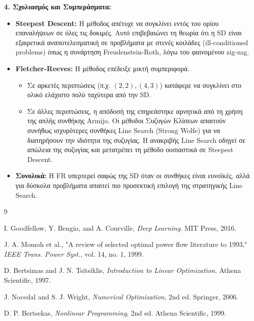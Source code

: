 \documentclass[a4paper,12pt]{article}
\begin{document}
\textbf{4. Σχολιασμός και Συμπεράσματα:}
\begin{itemize}
    \item \textbf{Steepest Descent:} Η μέθοδος απέτυχε να συγκλίνει εντός του ορίου επαναλήψεων σε όλες τις δοκιμές. Αυτό επιβεβαιώνει τη θεωρία ότι η SD είναι εξαιρετικά αναποτελεσματική σε προβλήματα με στενές κοιλάδες (ill-conditioned problems) όπως η συνάρτηση Freudenstein-Roth, λόγω του φαινομένου zig-zag.
    \item \textbf{Fletcher-Reeves:} Η μέθοδος επέδειξε μικτή συμπεριφορά.
    \begin{itemize}
        \item Σε αρκετές περιπτώσεις (π.χ. $(2,2), (4,3)$) κατάφερε να συγκλίνει στο ολικό ελάχιστο πολύ ταχύτερα από την SD.
        \item Σε άλλες περιπτώσεις, η απόδοσή της επηρεάστηκε αρνητικά από τη χρήση της απλής συνθήκης Armijo. Οι μέθοδοι Συζυγών Κλίσεων απαιτούν συνήθως ισχυρότερες συνθήκες Line Search (Strong Wolfe) για να διατηρήσουν την ιδιότητα της συζυγίας. Η ανακριβής Line Search οδηγεί σε απώλεια της συζυγίας και μετατρέπει τη μέθοδο ουσιαστικά σε Steepest Descent.
    \end{itemize}
    \item \textbf{Συνολικά:} Η FR υπερτερεί σαφώς της SD όταν οι συνθήκες είναι ευνοϊκές, αλλά για δύσκολα προβλήματα απαιτεί πιο προσεκτική επιλογή της στρατηγικής Line Search.
\end{itemize}

\begin{thebibliography}{9}

I. Goodfellow, Y. Bengio, and A. Courville, \textit{Deep Learning}. MIT Press, 2016.

J. A. Momoh et al., "A review of selected optimal power flow literature to 1993," \textit{IEEE Trans. Power Syst.}, vol. 14, no. 1, 1999.

D. Bertsimas and J. N. Tsitsiklis, \textit{Introduction to Linear Optimization}. Athena Scientific, 1997.

J. Nocedal and S. J. Wright, \textit{Numerical Optimization}, 2nd ed. Springer, 2006.

D. P. Bertsekas, \textit{Nonlinear Programming}, 2nd ed. Athena Scientific, 1999.

\end{thebibliography}
\end{document}
